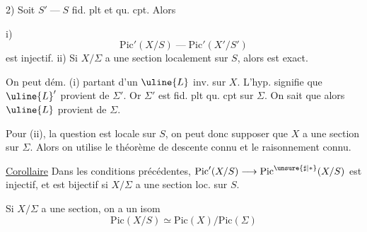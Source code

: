 2) Soit $S'\mathbin{\text{---}}S$ fid. plt et qu. cpt. Alors

i)
\[
\mathrm{Pic}'(X/S)\mathbin{\text{---}}\mathrm{Pic}'(X'/S')
\]
est injectif. ii) Si $X/\Sigma$ a  une section  localement sur $S$, alors
est exact.

On peut dém. (i) partant d'un $\uline{L}$ inv. sur $X$.  L'hyp. signifie que $\uline{L}'$ provient de $\Sigma'$. Or $\Sigma'$ est fid. plt qu. cpt sur $\Sigma$. On sait que alors $\uline{L}$ provient de $\Sigma$.

Pour (ii),  la question est locale sur $S$, on peut donc supposer que $X$ a une section sur $\Sigma$. Alors on utilise le théorème de descente connu et le raisonnement connu.

\uline{Corollaire}  Dans les conditions précédentes, $\mathrm{Pic}'(X/S)\longrightarrow\mathrm{Pic}^{\unsure{\sharp|*}}(X/S)$ est injectif, et est bijectif si $X/\Sigma$  a une section loc. sur $S$.

Si $X/\Sigma$ a \unsure{=} une section, on a un isom
\[
\mathrm{Pic}(X/S)\simeq\mathrm{Pic}(X)/\mathrm{Pic}(\Sigma)
\]

